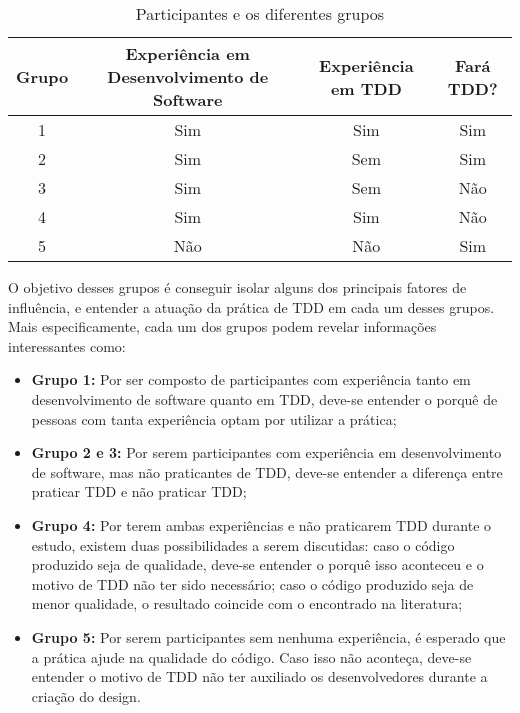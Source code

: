 \begin{table}
	\caption{Participantes e os diferentes grupos}
	\begin{tabular}{c | c | c | c |}
		\hline
		Grupo & Experiência em Desenvolvimento de Software & Experiência em TDD & Fará TDD? \\ 	\hline
		1 & Sim & Sim & Sim \\ 	\hline
		2 & Sim & Sem & Sim \\ 	\hline
		3 & Sim & Sem & Não \\ 	\hline
		4 & Sim & Sim & Não \\ 	\hline
		5 & Não & Não & Sim \\ 	\hline
	\end{tabular}
\end{table}

O objetivo desses grupos é conseguir isolar alguns dos principais fatores de influência,
e entender a atuação da prática de TDD em cada um desses grupos. Mais especificamente,
cada um dos grupos podem revelar informações interessantes como:

\begin{itemize}
	\item \textbf{Grupo 1:} Por ser composto de participantes com experiência tanto
	em desenvolvimento de software quanto em TDD, deve-se entender o porquê de
	pessoas com tanta experiência optam por utilizar a prática;
	
	\item \textbf{Grupo 2 e 3:} Por serem participantes com experiência em desenvolvimento
	de software, mas não praticantes de TDD, deve-se entender a diferença entre
	praticar TDD e não praticar TDD;
	
	\item \textbf{Grupo 4:} Por terem ambas experiências e não praticarem TDD durante o estudo,
	existem duas possibilidades a serem discutidas: caso o código produzido seja de qualidade, 
	deve-se entender o porquê isso aconteceu e o motivo de TDD não ter sido necessário; 
	caso o código produzido seja de menor qualidade, o resultado coincide com o encontrado na
	literatura;
	
	\item \textbf{Grupo 5:} Por serem participantes sem nenhuma experiência, é esperado que
	a prática ajude na qualidade do código. Caso isso não aconteça, deve-se entender o motivo de TDD
	não ter auxiliado os desenvolvedores durante a criação do design.
\end{itemize}

